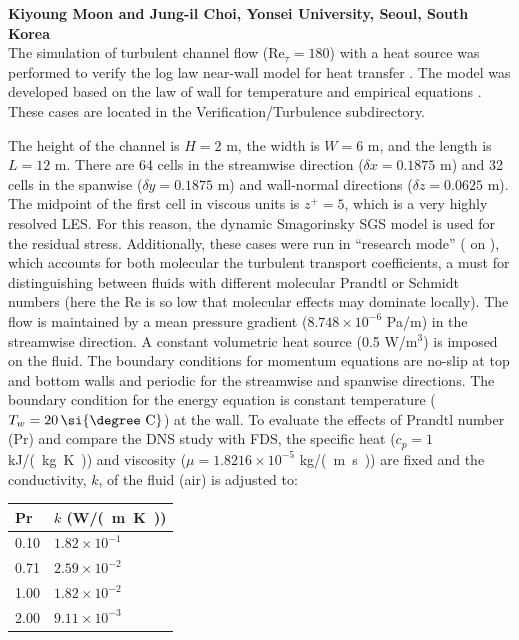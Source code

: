 \documentclass[11pt]{book}
\begin{document}
\textbf{Kiyoung Moon and Jung-il Choi, Yonsei University, Seoul, South Korea}\\

\noindent The simulation of turbulent channel flow (Re$_{\tau}=180$) with a heat source was performed to verify the log law near-wall model for heat transfer \cite{FDS_Tech_Guide}. The model was developed based on the law of wall for temperature and empirical equations \cite{Kader:1981}. These cases are located in the Verification/Turbulence subdirectory.

The height of the channel is $H=2$ m, the width is $W=6$ m, and the length is $L=12$ m. There are 64 cells in the streamwise direction ($\delta x = 0.1875$ m) and 32 cells in the spanwise ($\delta y=0.1875$ m) and wall-normal directions ($\delta z=0.0625$ m).  The midpoint of the first cell in viscous units is $z^+ = 5$, which is a very highly resolved LES. For this reason, the dynamic Smagorinsky SGS model is used for the residual stress. Additionally, these cases were run in ``research mode'' ( on ), which accounts for both molecular the turbulent transport coefficients, a must for distinguishing between fluids with different molecular Prandtl or Schmidt numbers (here the Re is so low that molecular effects may dominate locally).  The flow is maintained by a mean pressure gradient ($8.748 \times 10^{-6}$ Pa/m) in the streamwise direction. A constant volumetric heat source (0.5 W/m$^3$) is imposed on the fluid. The boundary conditions for momentum equations are no-slip at top and bottom walls and periodic for the streamwise and spanwise directions. The boundary condition for the energy equation is constant temperature ($T_w = 20 \,\mbox{\si{\degree C}} $) at the wall. To evaluate the effects of Prandtl number (Pr) and compare the DNS study \cite{Kim:1987} with FDS, the specific heat ($c_p = 1$ \si{kJ/(kg.K)}) and viscosity ($\mu = 1.8216 \times 10^{-5}$ \si{kg/(m.s)}) are fixed and the conductivity, $k$, of the fluid (air) is adjusted to:
\begin{center}
\begin{tabular}{ll}
Pr & $k$ (\si{W/(m.K)}) \\
\hline
0.10 & $1.82 \times 10^{-1}$ \\
0.71 & $2.59 \times 10^{-2}$ \\
1.00 & $1.82 \times 10^{-2}$ \\
2.00 & $9.11 \times 10^{-3}$
\end{tabular}
\end{center}
\end{document}
